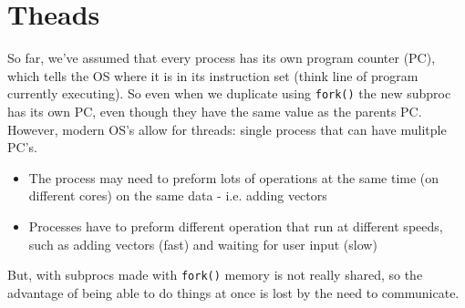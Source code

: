 \documentclass[a4paper, 10pt]{article}
\begin{document}
\section{Theads}
So far, we've assumed that every process has its own program counter (PC), which tells the OS where it is in its instruction set (think line of program currently executing). So even when we duplicate using \texttt{fork()} the new subproc has its own PC, even though they have the same value as the parents PC. \\[2ex]
However, modern OS's allow for threads: single process that can have mulitple PC's.

\begin{conceptbox}
    \begin{itemize}
        \item The process may need to preform lots of operations at the same time (on different cores) on the same data - i.e. adding vectors
        \item Processes have to preform different operation that run at different speeds, such as adding vectors (fast) and waiting for user input (slow)
    \end{itemize}
\end{conceptbox}
But, with subprocs made with \texttt{fork()} memory is not really shared, so the advantage of being able to do things at once is lost by the need to communicate.
\pagebreak
\end{document}
